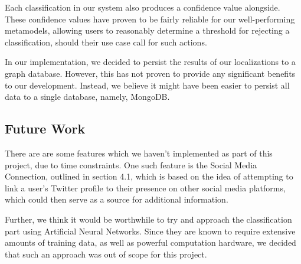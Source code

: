 \documentclass[10pt,a4paper]{article}
\begin{document}
Each classification in our system also produces a confidence value alongside. These confidence values have proven to be fairly reliable for our well-performing metamodels, allowing users to reasonably determine a threshold for rejecting a classification, should their use case call for such actions.

In our implementation, we decided to persist the results of our localizations to a graph database. However, this has not proven to provide any significant benefits to our development. Instead, we believe it might have been easier to persist all data to a single database, namely, MongoDB.

\subsection{Future Work}
There are are some features which we haven't implemented as part of this project, due to time constraints. One such feature is the Social Media Connection, outlined in section 4.1, which is based on the idea of attempting to link a user's Twitter profile to their presence on other social media platforms, which could then serve as a source for additional information.

Further, we think it would be worthwhile to try and approach the classification part using Artificial Neural Networks. Since they are known to require extensive amounts of training data, as well as powerful computation hardware, we decided that such an approach was out of scope for this project.
\end{document}
